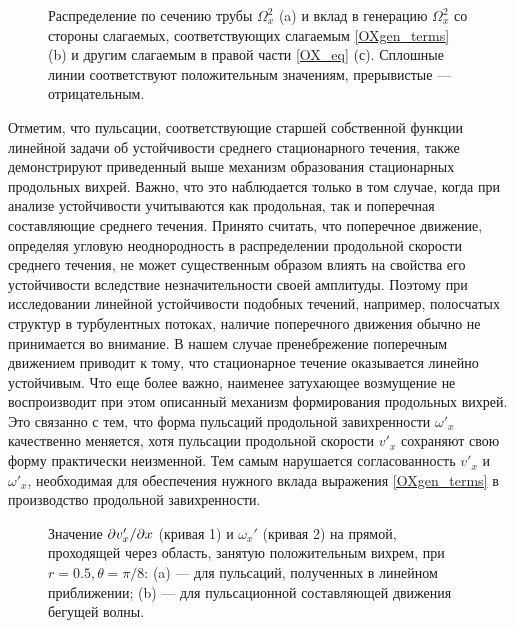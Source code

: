 \begin{figure}
\caption{Распределение по сечению трубы $\Omega_x^2$ (a) и вклад в генерацию $\Omega_x^2$ со стороны слагаемых, соответствующих слагаемым \eqref{OXgen_terms} (b) и другим слагаемым в правой части \eqref{OX_eq} (с). Сплошные линии соответствуют положительным значениям, прерывистые --- отрицательным.}
\label{OXgen_pic}
\end{figure}

Отметим, что пульсации, соответствующие старшей собственной функции линейной задачи об устойчивости среднего стационарного течения, также демонстрируют приведенный выше механизм образования стационарных продольных вихрей. Важно, что это наблюдается только в том случае, когда при анализе устойчивости учитываются как продольная, так и поперечная составляющие среднего течения. Принято считать, что поперечное движение, определяя угловую неоднородность в распределении продольной скорости среднего течения, не может существенным образом влиять на свойства его устойчивости вследствие незначительности своей амплитуды. Поэтому при исследовании линейной устойчивости подобных течений, например, полосчатых структур в турбулентных потоках, наличие поперечного движения обычно не принимается во внимание. В нашем случае пренебрежение поперечным движением приводит к тому, что стационарное течение оказывается линейно устойчивым. Что еще более важно, наименее затухающее возмущение не воспроизводит при этом описанный механизм формирования продольных вихрей. Это связанно с тем, что форма пульсаций продольной завихренности $\omega'_x$ качественно меняется, хотя пульсации продольной скорости $v'_x$ сохраняют свою форму практически неизменной. Тем самым нарушается согласованность  $v'_x$ и $\omega'_x$, необходимая для обеспечения нужного вклада выражения \eqref{OXgen_terms} в производство продольной завихренности.

\begin{figure}
\caption{Значение $\partial v_x' /\partial x$ (кривая 1) и $\omega_x'$ (кривая 2) на прямой, проходящей через область, занятую положительным вихрем, при $r = 0.5, \theta = \pi/8$: (a) --- для пульсаций, полученных в линейном приближении; (b) --- для пульсационной составляющей движения бегущей волны. }
\label{OXgen_corr_pic}
\end{figure}

